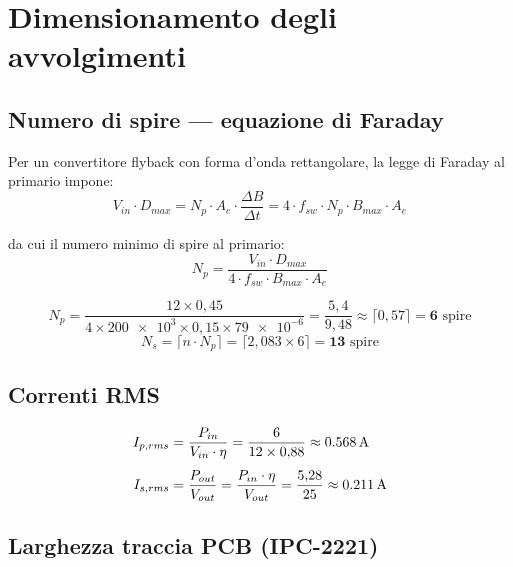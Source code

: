 \documentclass[a4paper,11pt]{article}
\begin{document}
\section{Dimensionamento degli avvolgimenti}

\subsection{Numero di spire — equazione di Faraday}

Per un convertitore flyback con forma d'onda rettangolare, la legge di
Faraday al primario impone:
\begin{equation}
  V_{in} \cdot D_{max} = N_p \cdot A_e \cdot \frac{\Delta B}{\Delta t}
  = 4 \cdot f_{sw} \cdot N_p \cdot B_{max} \cdot A_e
  \label{eq:faraday}
\end{equation}

da cui il numero minimo di spire al primario:
\begin{equation}
  \boxed{N_p = \frac{V_{in} \cdot D_{max}}{4 \cdot f_{sw} \cdot B_{max} \cdot A_e}}
  \label{eq:Np}
\end{equation}

\begin{tcolorbox}[resultbox, title={Calcolo numerico}]
\[
N_p = \frac{12 \times 0{,}45}{4 \times \num{200e3} \times 0{,}15 \times \num{79e-6}}
     = \frac{5{,}4}{9{,}48}
     \approx \lceil 0{,}57 \rceil = \mathbf{6} \text{ spire}
\]
\[
N_s = \lceil n \cdot N_p \rceil = \lceil 2{,}083 \times 6 \rceil = \mathbf{13} \text{ spire}
\]
\end{tcolorbox}

\subsection{Correnti RMS}

\begin{align}
  I_{p,rms} &= \frac{P_{in}}{V_{in} \cdot \eta}
             = \frac{6}{12 \times 0{,}88} \approx \SI{0{,}568}{\ampere}
  \label{eq:Ip} \\[4pt]
  I_{s,rms} &= \frac{P_{out}}{V_{out}}
             = \frac{P_{in} \cdot \eta}{V_{out}}
             = \frac{5{,}28}{25} \approx \SI{0{,}211}{\ampere}
  \label{eq:Is}
\end{align}

\subsection{Larghezza traccia PCB (IPC-2221)}
\end{document}
